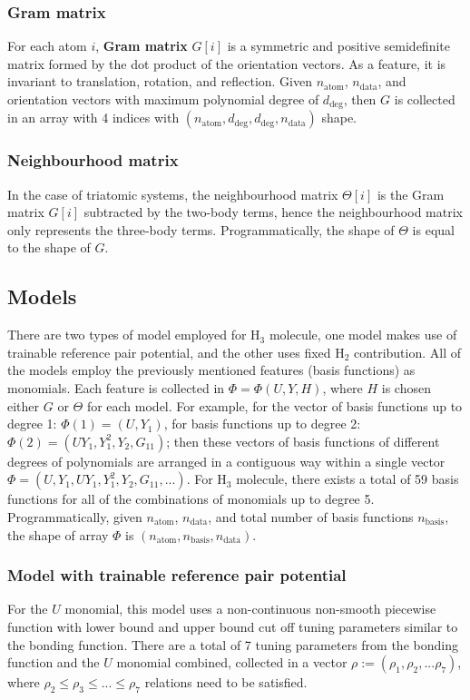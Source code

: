 \documentclass[12pt]{article}
\begin{document}
\subsubsection{Gram matrix}
For each atom $i$, \textbf{Gram matrix} $G[i]$ is a symmetric and positive semidefinite matrix formed by the dot product of the orientation vectors. As a feature, it is invariant to translation, rotation, and reflection. Given $n_{\text{atom}}$, $n_{\text{data}}$, and orientation vectors with maximum polynomial degree of $d_{\text{deg}}$, then $G$ is collected in an array with 4 indices with $(n_{\text{atom}}, d_{\text{deg}}, d_{\text{deg}}, n_{\text{data}})$ shape.

\subsubsection{Neighbourhood matrix}
In the case of triatomic systems, the neighbourhood matrix $\Theta[i]$ is the Gram matrix $G[i]$ subtracted by the two-body terms, hence the neighbourhood matrix only represents the three-body terms. Programmatically, the shape of $\Theta$ is equal to the shape of $G$.


\subsection{Models}
There are two types of model employed for H$_3$ molecule, one model makes use of trainable reference pair potential, and the other uses fixed H$_2$ contribution. All of the models employ the previously mentioned features (basis functions) as monomials. Each feature is collected in $\Phi = \Phi(U, Y, H)$, where $H$ is chosen either $G$ or $\Theta$ for each model. For example, for the vector of basis functions up to degree 1: $\Phi(1) = (U, Y_1)$, for basis functions up to degree 2: $\Phi(2) = (UY_1, Y_1^2, Y_2, G_{11})$; then these vectors of basis functions of different degrees of polynomials are arranged in a contiguous way within a single vector $\Phi = (U, Y_1, UY_1, Y_1^2, Y_2, G_{11},...)$. For H$_3$ molecule, there exists a total of 59 basis functions for all of the combinations of monomials up to degree 5. Programmatically, given $n_{\text{atom}}$, $n_{\text{data}}$, and total number of basis functions $n_{\text{basis}}$, the shape of array $\Phi$ is $(n_{\text{atom}}, n_{\text{basis}}, n_{\text{data}})$.


\subsubsection{Model with trainable reference pair potential}
\label{subsub:trainablepair}
For the $U$ monomial, this model uses a non-continuous non-smooth piecewise function with lower bound and upper bound cut off tuning parameters similar to the bonding function. There are a total of 7 tuning parameters from the bonding function and the $U$ monomial combined, collected in a vector $\rho := (\rho_1, \rho_2, ...\rho_7)$, where $\rho_2 \leq \rho_3 \leq ... \leq \rho_7$ relations need to be satisfied. 
\end{document}
